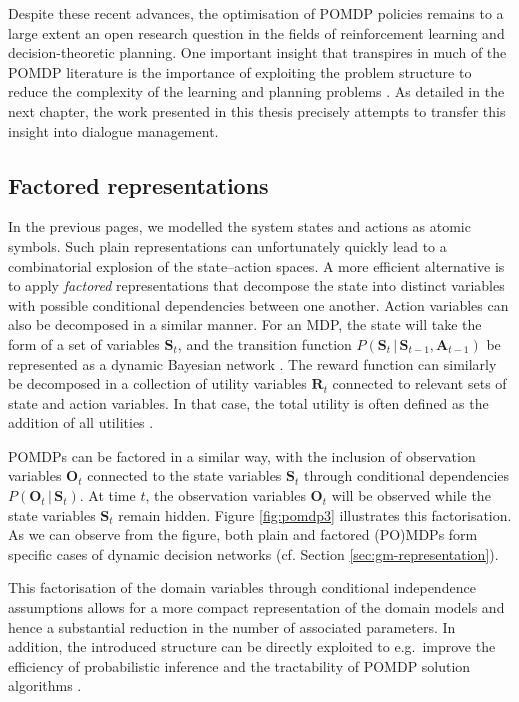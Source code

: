 Despite these recent advances, the optimisation of POMDP policies remains to a large extent an open research question in the fields of reinforcement learning and decision-theoretic planning. One important insight that transpires in much of the POMDP literature is the importance of exploiting the problem structure to reduce the complexity of the learning and planning problems \citep{Pineau:2004,poupart2005}.  As detailed in the next chapter, the work presented in this thesis precisely attempts to transfer this insight into dialogue management. 

\subsection{Factored representations}
\label{sec:factored}
In the previous pages, we modelled the system states and actions as atomic symbols.  Such plain representations can unfortunately quickly lead to a combinatorial explosion of the state--action spaces. A more efficient alternative is to apply \textit{factored} representations that decompose the state into distinct variables with possible conditional dependencies between one another.  Action variables can also be decomposed in a similar manner.  For an MDP, the state will take the form of a set of variables $\mathbf{S}_t$, and the transition function $P(\mathbf{S}_t \, | \, \mathbf{S}_{t-1},\mathbf{A}_{t-1})$ be represented as a dynamic Bayesian network \citep{boutilier1999}. The reward function can similarly be decomposed in a collection of utility variables $\mathbf{R}_t$ connected to relevant sets of state and action variables. In that case, the total utility is often defined as the addition of all utilities \citep{Bacchus:1995}.

POMDPs can be factored in a similar way, with the inclusion of observation variables $\mathbf{O}_t$ connected to the state variables $\mathbf{S}_t$ through conditional dependencies $P(\mathbf{O}_t \, | \, \mathbf{S}_t)$.  At time $t$, the observation variables $\mathbf{O}_t$ will be observed while the state variables  $\mathbf{S}_t$ remain hidden. 
Figure \ref{fig:pomdp3} illustrates this factorisation. As we can observe from the figure, both plain and factored (PO)MDPs form specific cases of dynamic decision networks (cf. Section \ref{sec:gm-representation}). 

This factorisation of the domain variables through conditional independence assumptions allows for a more compact representation of the domain models and hence a substantial reduction in the number of associated parameters.  In addition, the introduced structure can be directly exploited to e.g.\ improve the efficiency of probabilistic inference \citep{Koller+Friedman:09} and the tractability of POMDP solution algorithms \citep{poupart2005}.

